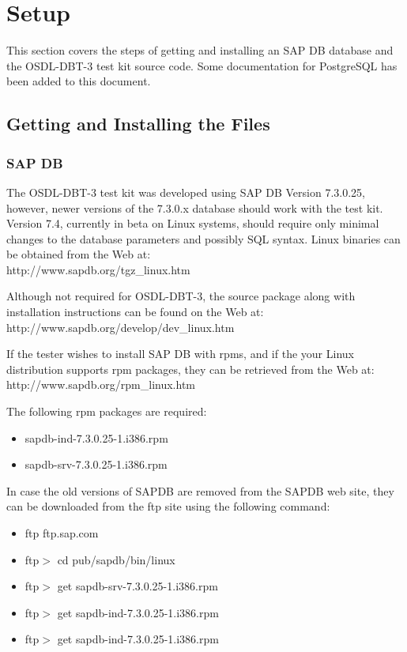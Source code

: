\documentclass{article}
\begin{document}
\section{Setup}

This section covers the steps of getting and installing an SAP DB
database and the OSDL-DBT-3 test kit source code.  Some documentation
for PostgreSQL has been added to this document.

\subsection{Getting and Installing the Files}

\subsubsection{SAP DB}

The OSDL-DBT-3 test kit was developed using SAP DB Version 7.3.0.25,
however, newer versions of the 7.3.0.x database should work with the
test kit.  Version 7.4, currently in beta on Linux systems, should
require only minimal changes to the database parameters and possibly
SQL syntax.  Linux binaries can be obtained from the Web at: \\
\indent http://www.sapdb.org/tgz\_linux.htm

\noindent
Although not required for OSDL-DBT-3, the source package along with
installation instructions can be found on the Web at: \\
\indent http://www.sapdb.org/develop/dev\_linux.htm

\noindent
If the tester wishes to install SAP DB with rpms, and if the your
Linux distribution supports rpm packages, they can be retrieved from
the Web at: \\
\indent http://www.sapdb.org/rpm\_linux.htm

\noindent
The following rpm packages are required:
\begin{itemize}
\item sapdb-ind-7.3.0.25-1.i386.rpm
\item sapdb-srv-7.3.0.25-1.i386.rpm
\end{itemize}

\noindent
In case the old versions of SAPDB are removed from the SAPDB web
site, they can be downloaded from the ftp site using the following
command: \\
\begin{itemize}
\item ftp ftp.sap.com
\item ftp$>$ cd pub/sapdb/bin/linux
\item ftp$>$ get sapdb-srv-7.3.0.25-1.i386.rpm
\item ftp$>$ get sapdb-ind-7.3.0.25-1.i386.rpm
\item ftp$>$ get sapdb-ind-7.3.0.25-1.i386.rpm
\end{itemize}
\end{document}
